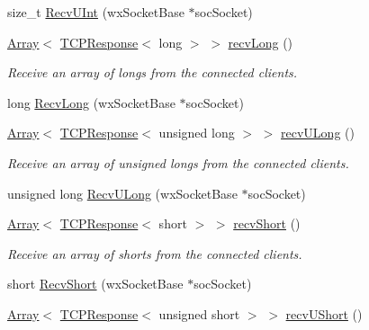 \begin{DoxyCompactItemize}
size\+\_\+t \mbox{\hyperlink{class_rad_j_a_v_1_1_networking_1_1wx_widgets_t_c_p_server_a1da60c55430445189de3ca68fe745f32}{Recv\+U\+Int}} (wx\+Socket\+Base $\ast$soc\+Socket)
\item 
\mbox{\hyperlink{class_rad_j_a_v_1_1_array}{Array}}$<$ \mbox{\hyperlink{class_rad_j_a_v_1_1_networking_1_1_t_c_p_response}{T\+C\+P\+Response}}$<$ long $>$ $>$ \mbox{\hyperlink{class_rad_j_a_v_1_1_networking_1_1wx_widgets_t_c_p_server_ab1675000bc5a5a6153822c4083cb1613}{recv\+Long}} ()
\begin{DoxyCompactList}\small\item\em Receive an array of longs from the connected clients. \end{DoxyCompactList}\item 
long \mbox{\hyperlink{class_rad_j_a_v_1_1_networking_1_1wx_widgets_t_c_p_server_a1d173552c639864d6e1a27f57b59ff9b}{Recv\+Long}} (wx\+Socket\+Base $\ast$soc\+Socket)
\item 
\mbox{\hyperlink{class_rad_j_a_v_1_1_array}{Array}}$<$ \mbox{\hyperlink{class_rad_j_a_v_1_1_networking_1_1_t_c_p_response}{T\+C\+P\+Response}}$<$ unsigned long $>$ $>$ \mbox{\hyperlink{class_rad_j_a_v_1_1_networking_1_1wx_widgets_t_c_p_server_aaa637832eee7760b0f4188caca5bf0c1}{recv\+U\+Long}} ()
\begin{DoxyCompactList}\small\item\em Receive an array of unsigned longs from the connected clients. \end{DoxyCompactList}\item 
unsigned long \mbox{\hyperlink{class_rad_j_a_v_1_1_networking_1_1wx_widgets_t_c_p_server_a5ed7e7f894f05987dc9801eed98235e2}{Recv\+U\+Long}} (wx\+Socket\+Base $\ast$soc\+Socket)
\item 
\mbox{\hyperlink{class_rad_j_a_v_1_1_array}{Array}}$<$ \mbox{\hyperlink{class_rad_j_a_v_1_1_networking_1_1_t_c_p_response}{T\+C\+P\+Response}}$<$ short $>$ $>$ \mbox{\hyperlink{class_rad_j_a_v_1_1_networking_1_1wx_widgets_t_c_p_server_a20b5fdde0172e6e714cd54296b7cb0e4}{recv\+Short}} ()
\begin{DoxyCompactList}\small\item\em Receive an array of shorts from the connected clients. \end{DoxyCompactList}\item 
short \mbox{\hyperlink{class_rad_j_a_v_1_1_networking_1_1wx_widgets_t_c_p_server_a9ffb0da4edac465b8e4d1ee8c5f3cd18}{Recv\+Short}} (wx\+Socket\+Base $\ast$soc\+Socket)
\item 
\mbox{\hyperlink{class_rad_j_a_v_1_1_array}{Array}}$<$ \mbox{\hyperlink{class_rad_j_a_v_1_1_networking_1_1_t_c_p_response}{T\+C\+P\+Response}}$<$ unsigned short $>$ $>$ \mbox{\hyperlink{class_rad_j_a_v_1_1_networking_1_1wx_widgets_t_c_p_server_a2945c9a822fb11575ad3379e2be83a32}{recv\+U\+Short}} ()

\end{DoxyCompactItemize}
